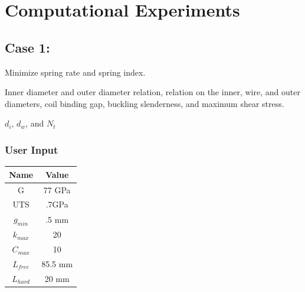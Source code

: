 \documentclass[10pt]{article}
\begin{document}

\section{Computational Experiments}
\label{sec:Computational_Experiments}

\subsection{Case 1:}
\label{subsec:Case1}

\begin{description}[leftmargin=!,labelwidth=\widthof{\bfseries State Variables:}, labelindent = 1cm]
 	\item [Objectives:] Minimize spring rate and spring index.\\

	\item[Constraints:] Inner diameter and outer diameter relation, relation on the inner, wire, and outer diameters, coil binding gap, buckling slenderness, and maximum shear stress. \\
	\item[State Variables:] $d_{i}$, $d_{w}$, and $N_{t}$ \\
\end{description}

	\subsubsection{User Input}
	
\begin{center}
	 \begin{tabular}{| c  | c |  }
	 	\hline Name & Value\\
	 	\hline G & 77 GPa \\
		\hline UTS & .7GPa \\
		\hline $g_{min}$ & .5 mm\\ 
	 	\hline $k_{max}$ & 20\\
		\hline $C_{max}$ & 10\\
		\hline $L_{free}$ & 85.5 mm\\
		\hline $L_{hard}$ & 20 mm\\
		\hline
	 \end{tabular}
\end{center}
\end{document}
